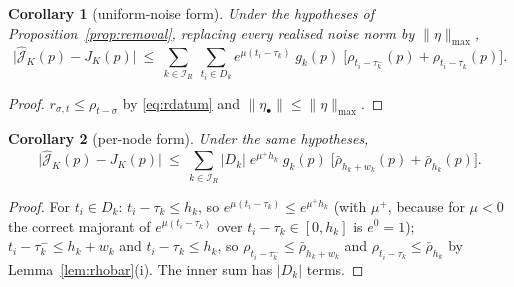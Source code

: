 \documentclass[11pt]{article}
\newtheorem{corollary}{Corollary}
\theoremstyle{remark}\newtheorem{remark}{Remark}
\newcommand{\norm}[1]{\lVert #1\rVert}
\newcommand{\hatJ}{\hat{\mathcal J}}
\begin{document}
\begin{corollary}[uniform-noise form]\label{cor:removal_rho}
Under the hypotheses of Proposition~\ref{prop:removal}, replacing every realised noise norm by $\norm\eta_{\max}$,
\begin{equation}
\big|\hatJ_K(p)-J_K(p)\big|\ \le\
\sum_{k\in\mathcal I_R}\ \sum_{t_i\in D_k}
e^{\mu(t_i-\tau_k)}\;g_k(p)\;\Big[\rho_{t_i-\tau_k^{-}}(p)+\rho_{t_i-\tau_k}(p)\Big].
\label{eq:prop_removal_node}
\end{equation}
\end{corollary}
\begin{proof}
$r_{\sigma,t}\le\rho_{t-\sigma}$ by \eqref{eq:rdatum} and $\norm{\eta_\bullet}\le\norm\eta_{\max}$.
\end{proof}

\begin{corollary}[per-node form]\label{cor:removal_node}
Under the same hypotheses,
\begin{equation}
\big|\hatJ_K(p)-J_K(p)\big|\ \le\
\sum_{k\in\mathcal I_R}|D_k|\;e^{\mu^{+}h_k}\;g_k(p)\;
\Big[\bar\rho_{h_k+w_k}(p)+\bar\rho_{h_k}(p)\Big].
\label{eq:prop_removal_pernode}
\end{equation}
\end{corollary}
\begin{proof}
For $t_i\in D_k$: $t_i-\tau_k\le h_k$, so $e^{\mu(t_i-\tau_k)}\le e^{\mu^{+}h_k}$ (with $\mu^{+}$, because for $\mu<0$ the correct majorant of $e^{\mu(t_i-\tau_k)}$ over $t_i-\tau_k\in[0,h_k]$ is $e^{0}=1$); $t_i-\tau_k^{-}\le h_k+w_k$ and $t_i-\tau_k\le h_k$, so $\rho_{t_i-\tau_k^{-}}\le\bar\rho_{h_k+w_k}$ and $\rho_{t_i-\tau_k}\le\bar\rho_{h_k}$ by Lemma~\ref{lem:rhobar}(i). The inner sum has $|D_k|$ terms.
\end{proof}
\end{document}

